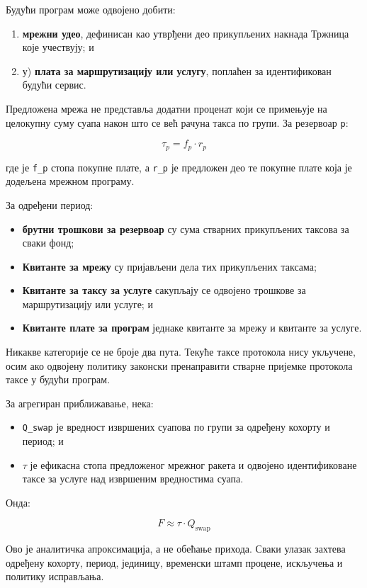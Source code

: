 \documentclass[11pt]{article}
\begin{document}
Будући програм може одвојено добити:

\begin{enumerate}[leftmargin=*]
\item \textbf{мрежни удео}, дефинисан као утврђени део прикупљених накнада Тржница које учествују; и
\item у) \textbf{плата за маршрутизацију или услугу}, поплаћен за идентификован будући сервис.
\end{enumerate}
Предложена мрежа не представља додатни проценат који се примењује на целокупну суму суапа након што се већ рачуна такса по групи. За резервоар \texttt{p}:

\[
\tau_p = f_p \cdot r_p
\]

где је \texttt{f\_p} стопа покупне плате, а \texttt{r\_p} је предложен део те покупне плате која је додељена мрежном програму.

За одређени период:

\begin{itemize}[leftmargin=*]
\item \textbf{брутни трошкови за резервоар} су сума стварних прикупљених таксова за сваки фонд;
\item \textbf{Квитанте за мрежу} су пријављени дела тих прикупљених таксама;
\item \textbf{Квитанте за таксу за услуге} сакупљају се одвојено трошкове за маршрутизацију или услуге; и
\item \textbf{Квитанте плате за програм} једнаке квитанте за мрежу и квитанте за услуге.
\end{itemize}
Никакве категорије се не броје два пута. Текуће таксе протокола нису укључене, осим ако одвојену политику законски пренаправити стварне пријемке протокола таксе у будући програм.

За агрегиран приближавање, нека:

\begin{itemize}[leftmargin=*]
\item \texttt{Q\_swap} је вредност извршених суапова по групи за одређену кохорту и период; и
\item \texttt{$\tau$} је ефикасна стопа предложеног мрежног ракета и одвојено идентификоване таксе за услуге над извршеним вредностима суапа.
\end{itemize}
Онда:

\[
F \approx \tau \cdot Q_{\mathrm{swap}}
\]

Ово је аналитичка апроксимација, а не обећање прихода. Сваки улазак захтева одређену кохорту, период, јединицу, временски штамп процене, искључења и политику исправљања.
\end{document}
